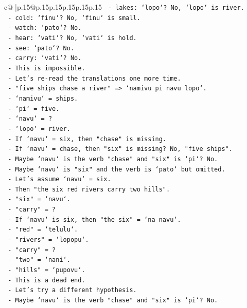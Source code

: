 \documentclass{article}
\begin{document}
{\begin{supertabular}{c@{$\;$}|p{.15\linewidth}@{}p{.15\linewidth}p{.15\linewidth}p{.15\linewidth}p{.15\linewidth}p{.15\linewidth}}
{{{\texttt{    {-} lakes: `lopo`? No, `lopo` is river.} \\
\texttt{    {-} cold: `finu`? No, `finu` is small.} \\
\texttt{    {-} watch: `pato`? No.} \\
\texttt{    {-} hear: `vati`? No, `vati` is hold.} \\
\texttt{    {-} see: `pato`? No.} \\
\texttt{    {-} carry: `vati`? No.} \\
\texttt{  {-} This is impossible.} \\
\texttt{  {-} Let's re{-}read the translations one more time.} \\
\texttt{  {-} "five ships chase a river" => `namivu pi navu lopo`.} \\
\texttt{    {-} `namivu` = ships.} \\
\texttt{    {-} `pi` = five.} \\
\texttt{    {-} `navu` = ?} \\
\texttt{    {-} `lopo` = river.} \\
\texttt{    {-} If `navu` = six, then "chase" is missing.} \\
\texttt{    {-} If `navu` = chase, then "six" is missing? No, "five ships".} \\
\texttt{    {-} Maybe `navu` is the verb "chase" and "six" is `pi`? No.} \\
\texttt{    {-} Maybe `navu` is "six" and the verb is `pato` but omitted.} \\
\texttt{    {-} Let's assume `navu` = six.} \\
\texttt{    {-} Then "the six red rivers carry two hills".} \\
\texttt{    {-} "six" = `navu`.} \\
\texttt{    {-} "carry" = ?} \\
\texttt{    {-} If `navu` is six, then "the six" = `na navu`.} \\
\texttt{    {-} "red" = `telulu`.} \\
\texttt{    {-} "rivers" = `lopopu`.} \\
\texttt{    {-} "carry" = ?} \\
\texttt{    {-} "two" = `nani`.} \\
\texttt{    {-} "hills" = `pupovu`.} \\
\texttt{  {-} This is a dead end.} \\
\texttt{  {-} Let's try a different hypothesis.} \\
\texttt{  {-} Maybe `navu` is the verb "chase" and "six" is `pi`? No.} \\
}}}
\end{supertabular}}
\end{document}
